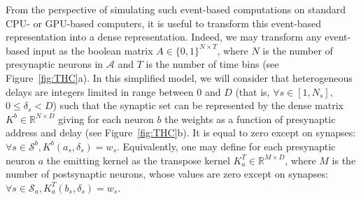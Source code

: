 \documentclass[runningheads]{llncs}
\newcommand{\presynaddr}{a} %
\newcommand{\postsynaddr}{b} %
\newcommand{\presynaddrspace}{\mathcal{A}} %
\newcommand{\synapse}{\mathcal{S}} %
\newcommand{\synapticweight}{w} %
\newcommand{\synapticdelay}{\delta} %
\newcommand{\ranksyn}{s} %
\newcommand{\Nsyn}{N_{s}} %
\newcommand{\kernel}{K} %
\begin{document}
From the perspective of simulating such event-based computations on standard CPU- or GPU-based computers, it is useful to transform this event-based representation into a dense representation. Indeed, we may transform any event-based input as the boolean matrix $A \in \{0, 1 \}^{N\times T}$, where $N$ is the number of presynaptic neurons in $\presynaddrspace$ and $T$ is the number of time bins (see Figure~\ref{fig:THC}a). In this simplified model, we will consider that heterogeneous delays are integers limited in range between $0$ and $D$ (that is, $\forall {\ranksyn \in [1,\Nsyn]}$, $0 \le \synapticdelay_\ranksyn < D$) such that the synaptic set can be represented by the dense matrix $\kernel^\postsynaddr \in \mathbb{R}^{N\times D}$ giving for each neuron $\postsynaddr$ the weights as a function of presynaptic address and delay (see Figure~\ref{fig:THC}b). It is equal to zero except on synapses: $\forall {\ranksyn \in \synapse^\postsynaddr}, \kernel^\postsynaddr(\presynaddr_\ranksyn,  \synapticdelay_\ranksyn) = \synapticweight_\ranksyn$. Equivalently, one may define for each presynaptic neuron $\presynaddr$ the emitting kernel as the transpose kernel $\kernel^T_\presynaddr \in \mathbb{R}^{M\times D}$, where $M$ is the number of postsynaptic neurons, whose values are zero except on synapses:  $\forall {\ranksyn \in \synapse_\presynaddr}, \kernel^T_\presynaddr(\postsynaddr_\ranksyn,  \synapticdelay_\ranksyn) = \synapticweight_\ranksyn$.
\end{document}
